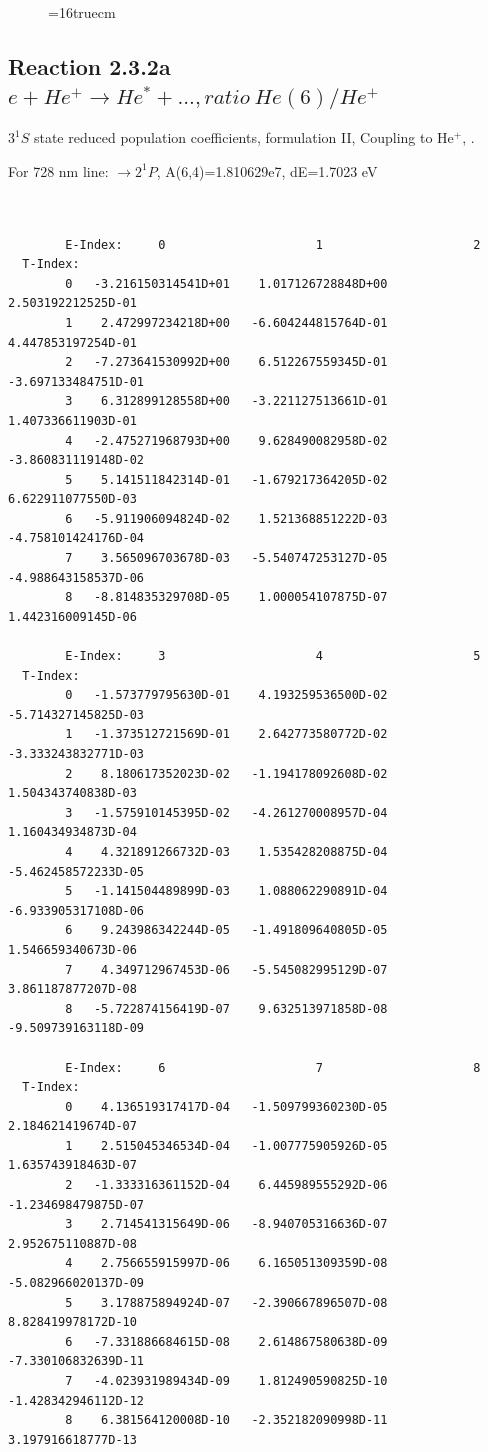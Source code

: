 \documentclass[12pt,dvips]{article}
\begin{document}
\begin{figure} \label{2.2e}
\epsfxsize=16truecm
\end{figure}
\newpage


\subsection{
  Reaction 2.3.2a $e + He^+ \rightarrow He^* + ...,  ratio ~ He(6)/He^+$
}

  $3^1S$ state
  reduced population coefficients, formulation II,
  Coupling to He$^+$, \cite{kn:Fujimoto}.

  For 728 nm line:  $\rightarrow 2^1P$, A(6,4)=1.810629e7, dE=1.7023 eV

\begin{small}\begin{verbatim}


        E-Index:     0                     1                     2
  T-Index:
        0   -3.216150314541D+01    1.017126728848D+00    2.503192212525D-01
        1    2.472997234218D+00   -6.604244815764D-01    4.447853197254D-01
        2   -7.273641530992D+00    6.512267559345D-01   -3.697133484751D-01
        3    6.312899128558D+00   -3.221127513661D-01    1.407336611903D-01
        4   -2.475271968793D+00    9.628490082958D-02   -3.860831119148D-02
        5    5.141511842314D-01   -1.679217364205D-02    6.622911077550D-03
        6   -5.911906094824D-02    1.521368851222D-03   -4.758101424176D-04
        7    3.565096703678D-03   -5.540747253127D-05   -4.988643158537D-06
        8   -8.814835329708D-05    1.000054107875D-07    1.442316009145D-06

        E-Index:     3                     4                     5
  T-Index:
        0   -1.573779795630D-01    4.193259536500D-02   -5.714327145825D-03
        1   -1.373512721569D-01    2.642773580772D-02   -3.333243832771D-03
        2    8.180617352023D-02   -1.194178092608D-02    1.504343740838D-03
        3   -1.575910145395D-02   -4.261270008957D-04    1.160434934873D-04
        4    4.321891266732D-03    1.535428208875D-04   -5.462458572233D-05
        5   -1.141504489899D-03    1.088062290891D-04   -6.933905317108D-06
        6    9.243986342244D-05   -1.491809640805D-05    1.546659340673D-06
        7    4.349712967453D-06   -5.545082995129D-07    3.861187877207D-08
        8   -5.722874156419D-07    9.632513971858D-08   -9.509739163118D-09

        E-Index:     6                     7                     8
  T-Index:
        0    4.136519317417D-04   -1.509799360230D-05    2.184621419674D-07
        1    2.515045346534D-04   -1.007775905926D-05    1.635743918463D-07
        2   -1.333316361152D-04    6.445989555292D-06   -1.234698479875D-07
        3    2.714541315649D-06   -8.940705316636D-07    2.952675110887D-08
        4    2.756655915997D-06    6.165051309359D-08   -5.082966020137D-09
        5    3.178875894924D-07   -2.390667896507D-08    8.828419978172D-10
        6   -7.331886684615D-08    2.614867580638D-09   -7.330106832639D-11
        7   -4.023931989434D-09    1.812490590825D-10   -1.428342946112D-12
        8    6.381564120008D-10   -2.352182090998D-11    3.197916618777D-13


\end{verbatim}
\end{small}
\end{document}
